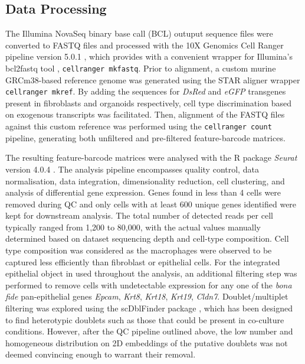 \subsection{Data Processing}

The Illumina NovaSeq binary base call (BCL) outuput sequence files were converted to FASTQ files and processed with the 10X Genomics Cell Ranger pipeline version 5.0.1 \cite{10x_genomics_what_nodate}, which provides with a convenient wrapper for Illumina's bcl2fastq tool \cite{illumina_bcl2fastq_nodate}, \texttt{cellranger mkfastq}. Prior to alignment, a custom murine GRCm38-based reference genome was generated using the STAR aligner \cite{dobin_star_2013} wrapper \texttt{cellranger mkref}. By adding the sequences for \textit{DsRed} and \textit{eGFP} transgenes present in fibroblasts and organoids respectively, cell type discrimination based on exogenous transcripts was facilitated. Then, alignment of the FASTQ files against this custom reference was performed using the \texttt{cellranger count} pipeline, generating both unfiltered and pre-filtered feature-barcode matrices.

The resulting feature-barcode matrices were analysed with the R package \textit{Seurat} version 4.0.4 \cite{hao_integrated_2021}. 
The analysis pipeline encompasses quality control, data normalisation, data integration, dimensionality reduction, cell clustering, and analysis of differential gene expression. 
Genes found in less than 4 cells were removed during QC and only cells with at least 600 unique genes identified were kept for downstream analysis. The total number of detected reads per cell typically ranged from 1,200 to 80,000, with the actual values manually determined based on dataset sequencing depth and cell-type composition. 
Cell type composition was considered as the macrophages were observed to be captured less efficiently than fibroblast or epithelial cells.
For the integrated epithelial object in used throughout the analysis, an additional filtering step was performed to remove cells with undetectable expression for any one of the \emph{bona fide} pan-epithelial genes \textit{Epcam}, \textit{Krt8}, \textit{Krt18}, \textit{Krt19}, \textit{Cldn7}. 
Doublet/multiplet filtering was explored using the scDblFinder package \cite{germain_doublet_2022}, which has been designed to find heterotypic doublets such as those that could be present in co-culture conditions. However, after the QC pipeline outlined above, the low number and homogeneous distribution on 2D embeddings of the putative doublets was not deemed convincing enough to warrant their removal.

